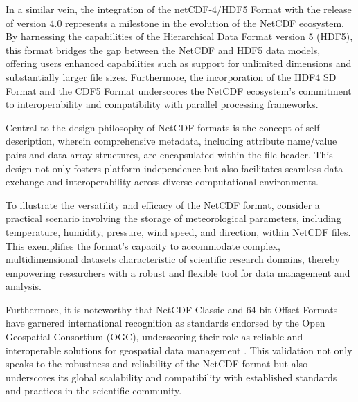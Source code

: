 In a similar vein, the integration of the netCDF-4/HDF5 Format with the release
of version 4.0 represents a milestone in the evolution of the NetCDF ecosystem.
By harnessing the capabilities of the Hierarchical Data Format version 5 (HDF5),
this format bridges the gap between the NetCDF and HDF5 data models, offering
users enhanced capabilities such as support for unlimited dimensions and
substantially larger file sizes. Furthermore, the incorporation of the HDF4 SD
Format and the CDF5 Format underscores the NetCDF ecosystem's commitment to
interoperability and compatibility with parallel processing frameworks.

Central to the design philosophy of NetCDF formats is the concept of
self-description, wherein comprehensive metadata, including attribute name/value
pairs and data array structures, are encapsulated within the file header. This
design not only fosters platform independence but also facilitates seamless data
exchange and interoperability across diverse computational environments.

To illustrate the versatility and efficacy of the NetCDF format, consider a
practical scenario involving the storage of meteorological parameters, including
temperature, humidity, pressure, wind speed, and direction, within NetCDF files.
This exemplifies the format's capacity to accommodate complex, multidimensional
datasets characteristic of scientific research domains, thereby empowering
researchers with a robust and flexible tool for data management and analysis.


Furthermore, it is noteworthy that NetCDF Classic and 64-bit Offset Formats have
garnered international recognition as standards endorsed by the Open Geospatial
Consortium (OGC), underscoring their role as reliable and interoperable
solutions for geospatial data management \cite{ogcnetcdf}. This validation not
only speaks to the robustness and reliability of the NetCDF format but also
underscores its global scalability and compatibility with established standards
and practices in the scientific community.
